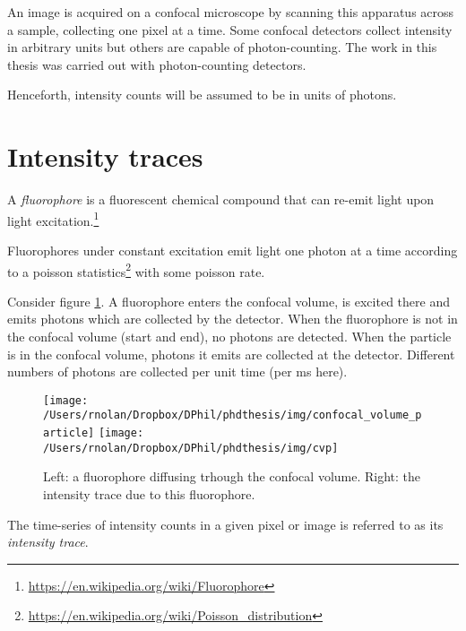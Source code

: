 \documentclass[12pt,]{book}
\let\rmarkdownfootnote\footnote%
\def\footnote{\protect\rmarkdownfootnote}
\theoremstyle{definition}
\theoremstyle{definition}
\theoremstyle{definition}
\theoremstyle{remark}
\let\BeginKnitrBlock\begin \let\EndKnitrBlock\end
\begin{document}
An image is acquired on a confocal microscope by scanning this apparatus
across a sample, collecting one pixel at a time. Some confocal detectors
collect intensity in arbitrary units but others are capable of
photon-counting. The work in this thesis was carried out with
photon-counting detectors.

\BeginKnitrBlock{remark}
\iffalse{} {Remark. } \fi{}Henceforth, intensity counts will be assumed
to be in units of photons.
\EndKnitrBlock{remark}

\section{Intensity traces}\label{intensity-traces}

\BeginKnitrBlock{definition}
\protect\hypertarget{def:unnamed-chunk-3}{}{\label{def:unnamed-chunk-3} }A
\emph{fluorophore} is a fluorescent chemical compound that can re-emit
light upon light excitation.\footnote{\url{https://en.wikipedia.org/wiki/Fluorophore}}
\EndKnitrBlock{definition}

Fluorophores under constant excitation emit light one photon at a time
according to a poisson statistics\footnote{\url{https://en.wikipedia.org/wiki/Poisson_distribution}}
with some poisson rate.

Consider figure \ref{fig:confocal-volume-particle}. A fluorophore enters
the confocal volume, is excited there and emits photons which are
collected by the detector. When the fluorophore is not in the confocal
volume (start and end), no photons are detected. When the particle is in
the confocal volume, photons it emits are collected at the detector.
Different numbers of photons are collected per unit time (per ms here).





\begin{figure}

\texttt{[image: /Users/rnolan/Dropbox/DPhil/phdthesis/img/confocal\_volume\_particle]} \texttt{[image: /Users/rnolan/Dropbox/DPhil/phdthesis/img/cvp]} \hfill{}

\caption{Left: a fluorophore diffusing
trhough the confocal volume. Right: the intensity trace due to this
fluorophore.}\label{fig:confocal-volume-particle}
\end{figure}

\BeginKnitrBlock{definition}
\protect\hypertarget{def:unnamed-chunk-4}{}{\label{def:unnamed-chunk-4} }The
time-series of intensity counts in a given pixel or image is referred to
as its \emph{intensity trace}.
\EndKnitrBlock{definition}
\end{document}
